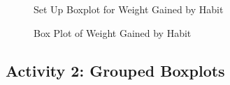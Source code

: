 \begin{figure}[H]
  \begin{center}
    \caption{Set Up Boxplot for Weight Gained by Habit}
  \end{center}
\end{figure}

\begin{figure}[H]
  \begin{center}
    \caption{Box Plot of Weight Gained by Habit}
  \end{center}
\end{figure}

\subsection{Activity 2: Grouped Boxplots} \label{vdi:act02}

